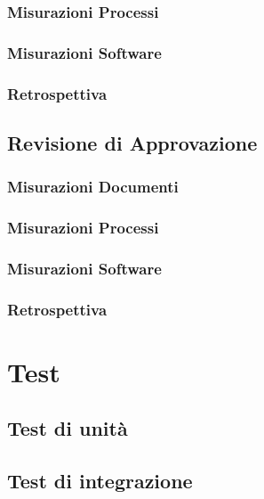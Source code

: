 \documentclass[a4paper, oneside, openany, dvipsnames, table]{article}
\begin{document}
		\subsubsection{Misurazioni Processi}
			
		\subsubsection{Misurazioni Software}
			
		\subsubsection{Retrospettiva}
			

\newpage
	\subsection{Revisione di Approvazione}
		\subsubsection{Misurazioni Documenti}
			
		\subsubsection{Misurazioni Processi}
			
		\subsubsection{Misurazioni Software}
			
		\subsubsection{Retrospettiva}
			

\newpage
\section{Test}


\subsection{Test di unità}
	
\subsection{Test di integrazione}
	
\end{document}
